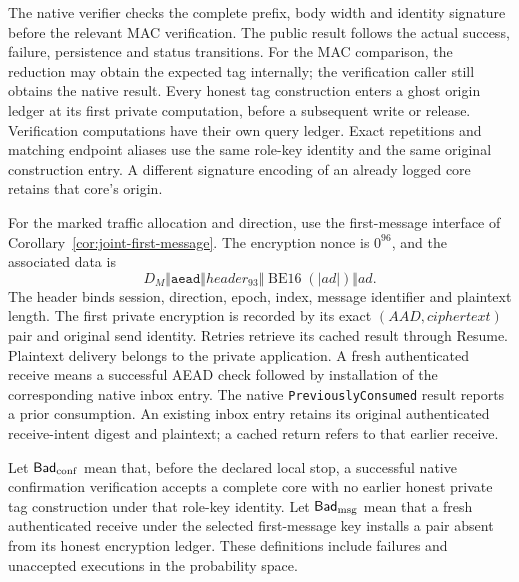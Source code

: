 \documentclass[pdflatex]{sn-jnl}
\theoremstyle{thmstyleone}
\theoremstyle{thmstylethree}
\theoremstyle{thmstyletwo}
\begin{document}
The native verifier checks the complete prefix, body width and identity
signature before the relevant MAC verification. The public result follows
the actual success, failure, persistence and status transitions. For the MAC
comparison, the reduction may obtain the expected tag internally;
the verification caller still obtains the native result. Every honest tag
construction enters a ghost origin ledger at its first private
computation, before a subsequent write or release. Verification
computations have their own query ledger. Exact repetitions and matching
endpoint aliases use the same role-key identity and the same original
construction entry. A different signature encoding of an already logged
core retains that core's origin.

For the marked traffic allocation and direction, use the first-message
interface of Corollary~\ref{cor:joint-first-message}. The encryption nonce
is $0^{96}$, and the associated data is
\[
 D_M\Vert\texttt{aead}\Vert\mathit{header}_{93}
       \Vert\operatorname{BE16}(|ad|)\Vert ad.
\]
The header binds session, direction, epoch, index, message identifier and
plaintext length. The first private encryption is recorded by its exact
$(\mathit{AAD},\mathit{ciphertext})$ pair and original send identity.
Retries retrieve its cached result through Resume. Plaintext delivery
belongs to the private application. A fresh authenticated receive means
a successful AEAD check followed by installation of the corresponding
native inbox entry. The native \texttt{PreviouslyConsumed} result reports
a prior consumption. An existing inbox entry retains its
original authenticated receive-intent digest and plaintext; a cached
return refers to that earlier receive.

Let $\mathsf{Bad}_{\rm conf}$ mean that, before the declared local stop,
a successful native confirmation verification accepts a complete core
with no earlier honest private tag construction under that role-key
identity. Let $\mathsf{Bad}_{\rm msg}$ mean that a fresh authenticated
receive under the selected first-message key installs a pair absent from
its honest encryption ledger. These definitions include failures and
unaccepted executions in the probability space.
\end{document}
